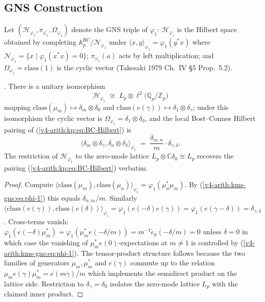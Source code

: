 \subsection{GNS Construction}
\label{v4-arith:kms-gns:cycle1:GNS}

Let \((\mathcal{H}_{\varphi_{1}},\pi_{\varphi_{1}},\Omega_{\varphi_{1}})\)
denote the GNS triple of \(\varphi_{1}\): \(\mathcal{H}_{\varphi_{1}}\)
is the Hilbert space obtained by completing \(\mathbb{A}^{\mathrm{BC}}_{p}/\mathcal{N}_{\varphi_{1}}\)
under
\(\langle x,y\rangle_{\varphi_{1}}=\varphi_{1}(y^{*}x)\) where
\(\mathcal{N}_{\varphi_{1}}=\{x\mid\varphi_{1}(x^{*}x)=0\}\);
\(\pi_{\varphi_{1}}(a)\) acts by left multiplication; and
\(\Omega_{\varphi_{1}}=\mathrm{class}(1)\) is the cyclic vector
(Takesaki 1979 Ch.~IV \S5 Prop.~5.2).

\begin{lemma}
\label{v4-arith:kms-gns:lem:GNS-space}
\ClaimStatusProvedHere. There is a unitary isomorphism
\begin{equation}
\label{v4-arith:kms-gns:eq:GNS-iso}
\mathcal{H}_{\varphi_{1}}\;\cong\;L_{p}\otimes\ell^{2}\bigl(\mathbb{Q}_{p}/\mathbb{Z}_{p}\bigr)
\end{equation}
mapping \(\mathrm{class}(\mu_{m})\mapsto\delta_{m}\otimes\delta_{0}\)
and \(\mathrm{class}(e(\gamma))\mapsto\delta_{1}\otimes\delta_{\gamma}\);
under this isomorphism the cyclic vector is
\(\Omega_{\varphi_{1}}=\delta_{1}\otimes\delta_{0}\), and the local
Bost--Connes Hilbert pairing of
(\ref{v4-arith:kp:eq:BC-Hilbert}) is
\begin{equation}
\label{v4-arith:kms-gns:eq:GNS-inner-product}
\bigl\langle\delta_{m}\otimes\delta_{\gamma},\delta_{n}\otimes\delta_{\delta}\bigr\rangle_{\varphi_{1}}\;=\;\frac{\delta_{m,n}}{m}\cdot\delta_{\gamma,\delta}.
\end{equation}
The restriction of \(\mathcal{H}_{\varphi_{1}}\) to the zero-mode
lattice \(L_{p}\otimes\mathbb{C}\delta_{0}\cong L_{p}\) recovers the
pairing (\ref{v4-arith:kp:eq:BC-Hilbert}) verbatim.
\end{lemma}

\begin{proof}
Compute \(\langle\mathrm{class}(\mu_{m}),\mathrm{class}(\mu_{n})\rangle_{\varphi_{1}}=\varphi_{1}(\mu_{n}^{*}\mu_{m})\).
By (\ref{v4-arith:kms-gns:eq:phi-1}) this equals
\(\delta_{n,m}/m\). Similarly
\(\langle\mathrm{class}(e(\gamma)),\mathrm{class}(e(\delta))\rangle_{\varphi_{1}}=\varphi_{1}(e(-\delta)e(\gamma))=\varphi_{1}(e(\gamma-\delta))=\delta_{\gamma,\delta}\).
Cross-terms vanish: \(\varphi_{1}(e(-\delta)\mu_{m}^{*})=\varphi_{1}(\mu_{m}^{*}e(-\delta/m))=m^{-1}\widetilde{e}_{p}(-\delta/m)=0\)
unless \(\delta=0\) in which case the vanishing of
\(\mu_{m}^{*}e(0)\)-expectations at \(m\neq 1\) is controlled by
(\ref{v4-arith:kms-gns:eq:phi-1}). The tensor-product structure
follows because the two families of generators \(\mu_{m},\mu_{m}^{*}\)
and \(e(\gamma)\) commute up to the relation \(\mu_{m}e(\gamma)\mu_{m}^{*}=e(m\gamma)/m\)
which implements the semidirect product on the lattice side.
Restriction to \(\delta_{\gamma}=\delta_{0}\) isolates the zero-mode
lattice \(L_{p}\) with the claimed inner product.
\end{proof}

